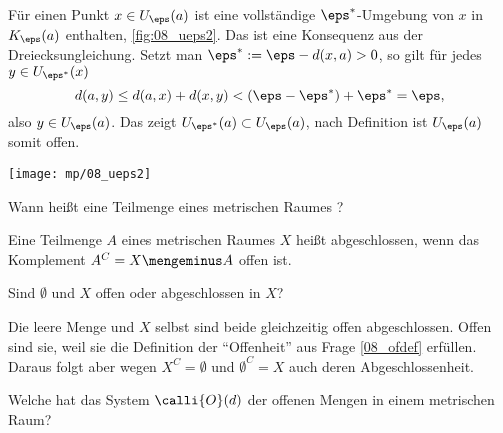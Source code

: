 \begin{antwort}
  Für einen Punkt $x \in U_\eps(a)$ ist eine vollständige 
  $\eps^*$-Umgebung von $x$ in $K_\eps(a)$ enthalten, \sieheAbbildung\ref{fig:08_ueps2}. 
  Das ist eine Konsequenz aus der Dreiecksungleichung. 
  Setzt man $\eps^* := \eps-d(x,a) >0$, so gilt 
  für jedes $y\in U_{\eps^*}(x)$ 
  \[
  d(a,y) \le d(a,x) + d(x,y) < (\eps - \eps^*) + \eps^* = \eps,
  \]
  also $y\in U_\eps(a)$. Das zeigt $U_{\eps^*}(a) \subset U_\eps(a)$, 
  nach Definition ist $U_\eps(a)$ somit offen. \AntEnd

  \begin{center}
    \texttt{[image: mp/08\_ueps2]}
    \label{fig:08_ueps2}
  \end{center}
\end{antwort}

\begin{frage}
  Wann heißt eine Teilmenge eines metrischen Raumes 
  ?
\end{frage}

\begin{antwort}
  Eine Teilmenge $A$ eines metrischen Raumes $X$ 
  heißt abgeschlossen, wenn 
  das Komplement $A^C = X \mengeminus A$ offen ist.
  \AntEnd
\end{antwort}

\begin{frage}\label{08_oua} 
  Sind $\emptyset$ und $X$ offen oder abgeschlossen in $X$?
\end{frage}

\begin{antwort}
  Die leere Menge und $X$ selbst sind 
  beide gleichzeitig offen  abgeschlossen. 
  Offen sind sie, weil sie die Definition 
  der "`Offenheit"' aus Frage \ref{08_ofdef} erfüllen. 
  Daraus folgt aber wegen $X^C = \emptyset$ und 
  $\emptyset^C = X$ auch deren Abgeschlossenheit. 
  \AntEnd
\end{antwort} 

\begin{frage}\label{08_grund}
  Welche  hat das 
  System $\calli{O}(d)$ der 
  offenen Mengen in einem metrischen Raum?
\end{frage}

